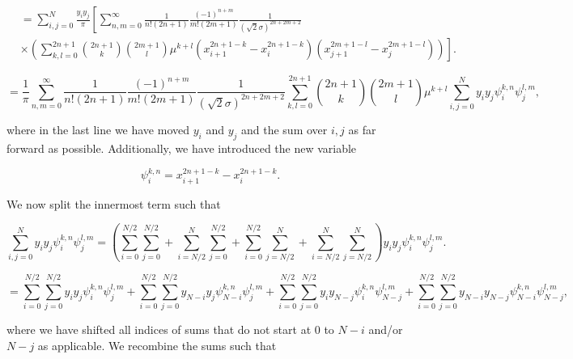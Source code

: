 \documentclass[apj]{emulateapj}
\begin{document}
\begin{equation}
\begin{aligned}
&= \sum_{i,j=0}^N  \frac{y_i y_j}{\pi} \left[ \sum_{n,m = 0}^\infty \frac{1}{n! (2n+1)} \frac{(-1)^{n+m}}{m! (2m+1)} \frac{1}{(\sqrt{2}\sigma)^{2n+2m+2}} \right. \\
& \left. \times \left( \sum_{k, l = 0}^{2n+1} {2n+1 \choose k} {2m+1 \choose l} \mu^{k+l} ( x_{i+1}^{2n+1-k} - x_{i}^{2n+1-k} ) ( x_{j+1}^{2m+1-l}- x_{j}^{2m+1-l}) \right) \right].
\end{aligned}
\end{equation}

\begin{equation} \label{eq:dcompleteklsum}
=  \frac{1}{\pi} \sum_{n,m = 0}^\infty \frac{1}{n! (2n+1)} \frac{(-1)^{n+m}}{m! (2m+1)} \frac{1}{(\sqrt{2}\sigma)^{2n+2m+2}} \sum_{k, l = 0}^{2n+1} {2n+1 \choose k} {2m+1 \choose l} \mu^{k+l} \sum_{i,j=0}^N y_i y_j \psi^{k, n}_i \psi^{l, m}_j,
\end{equation}

where in the last line we have moved $y_i$ and $y_j$ and the sum over $i,j$ as far forward as possible. Additionally, we have introduced the new variable

\begin{equation}
\psi_i^{k,n} = x_{i+1}^{2n+1-k} - x_{i}^{2n+1-k}.
\end{equation}

We now split the innermost term such that

\begin{equation}
\sum_{i,j = 0}^N y_i y_j \psi_i^{k, n} \psi_j^{l, m} = \left( \sum_{i = 0}^{N/2}\sum_{j = 0}^{N/2} + \sum_{i = N/2}^{N}\sum_{j = 0}^{N/2} + \sum_{i = 0}^{N/2}\sum_{j = N/2}^{N} + \sum_{i = N/2}^{N}\sum_{j = N/2}^{N} \right) y_i y_j \psi_i^{k, n} \psi_j^{l, m}.
\end{equation}

\begin{equation}
 = \sum_{i = 0}^{N/2}\sum_{j = 0}^{N/2} y_i y_j \psi_i^{k, n} \psi_j^{l, m} + \sum_{i = 0}^{N/2}\sum_{j = 0}^{N/2} y_{N-i} y_j \psi_{N-i}^{k, n} \psi_j^{l, m} + \sum_{i = 0}^{N/2}\sum_{j = 0}^{N/2} y_i y_{N-j} \psi_i^{k, n} \psi_{N-j}^{l, m} + \sum_{i = 0}^{N/2}\sum_{j = 0}^{N/2} y_{N-i} y_{N-j} \psi_{N-i}^{k, n} \psi_{N-j}^{l, m},
\end{equation}

where we have shifted all indices of sums that do not start at $0$ to $N-i$ and/or $N-j$ as applicable. We recombine the sums such that
\end{document}
